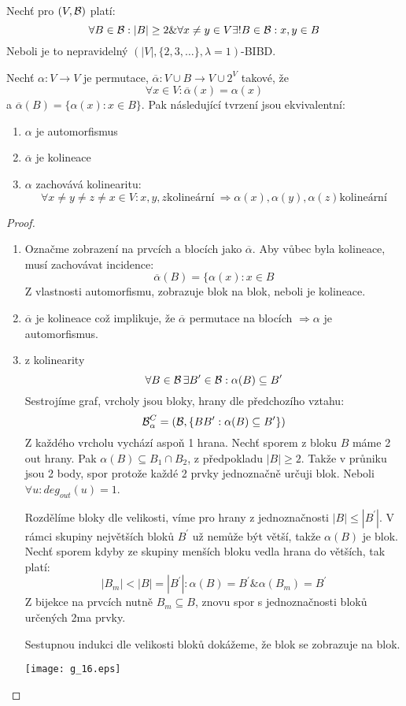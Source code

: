 \begin{theorem}\label{kpp:equiv}
    Nechť pro $(V,\operatorname{\mathcal{B}})$ platí:
    \[ \forall B \in \operatorname{\mathcal{B}}: |B| \geq 2 \& \forall x \ne y \in V \exists! B \in \operatorname{\mathcal{B}}: x, y \in B \]
    Neboli je to nepravidelný $(|V|, \{ 2, 3, \ldots \}, \lambda = 1)$-BIBD.

    Nechť $\alpha: V\rightarrow V$ je permutace, $\overline{\alpha}: V\cup B\rightarrow V\cup 2^V$ takové, že
    \[ \forall x \in V: \overline{\alpha}(x) = \alpha(x) \]
    a $\overline{\alpha}(B) = \{ \alpha(x): x \in B \}$.
    Pak následující tvrzení jsou ekvivalentní:
    \begin{enumerate}
        \item $\alpha$ je automorfismus
        \item $\overline{\alpha}$ je kolineace
        \item $\alpha$ zachovává kolinearitu:
		\[ \forall x \ne y \ne z \ne x \in V: x, y, z \text{kolineární}\ \Rightarrow \alpha(x), \alpha(y), \alpha(z) \text{kolineární} \]
    \end{enumerate}
\end{theorem}
\begin{proof}
    \begin{enumerate}
        \item Označme zobrazení na prvcích a blocích jako $\overline{\alpha}$.
		Aby vůbec byla kolineace, musí zachovávat incidence:
		\[ \overline{\alpha}(B) = \{ \alpha(x): x \in B \]
		Z vlastnosti automorfismu, zobrazuje blok na blok, neboli je kolineace.
        \item $\overline{\alpha}$ je kolineace což implikuje, že $\overline{\alpha}$ permutace na blocích $\Rightarrow \alpha$ je automorfismus.
        \item z kolinearity
		\[ \forall B \in \operatorname{\mathcal{B}} \exists B^{\prime} \in \operatorname{\mathcal{B}}: \alpha(B) \subseteq B^{\prime} \]
		Sestrojíme graf, vrcholy jsou bloky, hrany dle předchozího vztahu:
		\[ \operatorname{\mathcal{B}}_{\alpha}^C = (\operatorname{\mathcal{B}}, \{ BB^{\prime}: \alpha(B) \subseteq B^{\prime}\}) \]
		Z každého vrcholu vychází aspoň 1 hrana.
		Nechť sporem z bloku $B$ máme 2 out hrany.
		Pak $\alpha(B) \subseteq B_1 \cap B_2$, z předpokladu $|B| \geq 2$.
		Takže v průniku jsou 2 body, spor protože každé 2 prvky jednoznačně určuji blok.
		Neboli $\forall u: deg_{out}(u) = 1$.

		Rozdělíme bloky dle velikosti, víme pro hrany z jednoznačnosti $|B| \leq |B^{\prime}|$.
		V rámci skupiny největších bloků $B^{\prime}$ už nemůže být větší, takže $\alpha(B)$ je blok.
		Nechť sporem kdyby ze skupiny menších bloku vedla hrana do větších, tak platí:
		\[ |B_m| < |B| = |B^{\prime}|: \alpha(B) = B^{\prime} \& \alpha(B_m) = B^{\prime} \]
		Z bijekce na prvcích nutně $B_m \subseteq B$, znovu spor s jednoznačnosti bloků určených 2ma prvky.

		Sestupnou indukci dle velikosti bloků dokážeme, že blok se zobrazuje na blok.

    	\texttt{[image: g\_16.eps]}
    \end{enumerate}
\end{proof}

